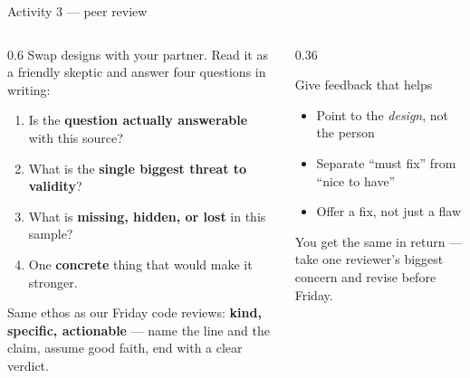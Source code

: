 \documentclass[9pt,aspectratio=169]{beamer}
\begin{document}
\begin{frame}{Activity 3 --- peer review}
    \begin{columns}[T]
        \begin{column}{0.6\textwidth}
            Swap designs with your partner. Read it as a friendly skeptic and answer four questions in writing:
            \begin{enumerate}\small
                \item Is the \textbf{question actually answerable} with this source?
                \item What is the \textbf{single biggest threat to validity}?
                \item What is \textbf{missing, hidden, or lost} in this sample?
                \item One \textbf{concrete} thing that would make it stronger.
            \end{enumerate}

            \vspace{0.6em}

            Same ethos as our Friday code reviews: \textbf{kind, specific, actionable} --- name the line and the claim, assume good faith, end with a clear verdict.
        \end{column}
        \begin{column}{0.36\textwidth}
            \begin{block}{Give feedback that helps}
                \footnotesize
                \begin{itemize}\footnotesize
                    \item Point to the \textit{design}, not the person
                    \item Separate ``must fix'' from ``nice to have''
                    \item Offer a fix, not just a flaw
                \end{itemize}
            \end{block}
            {\footnotesize You get the same in return --- take one reviewer's biggest concern and revise before Friday.}
        \end{column}
    \end{columns}
\end{frame}
\end{document}
